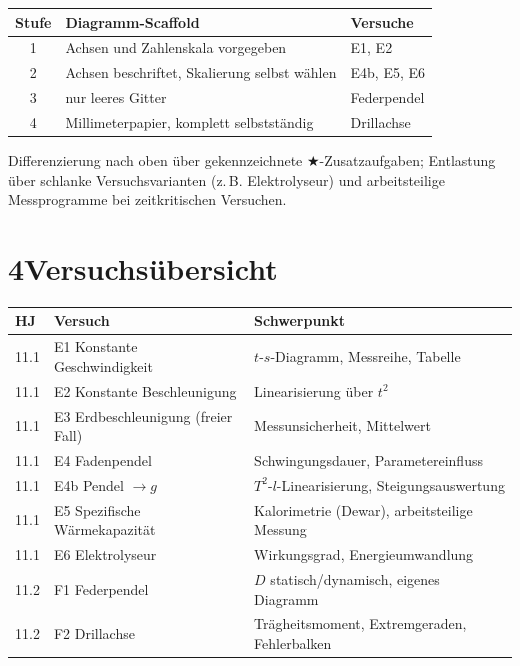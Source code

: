 \documentclass[11pt]{scrartcl}
\begin{document}
\begin{center}
\begin{tabular}{@{}cll@{}}
\toprule
\textbf{Stufe} & \textbf{Diagramm-Scaffold} & \textbf{Versuche} \\
\midrule
1 & Achsen und Zahlenskala vorgegeben        & E1, E2 \\
2 & Achsen beschriftet, Skalierung selbst wählen & E4b, E5, E6 \\
3 & nur leeres Gitter                        & Federpendel \\
4 & Millimeterpapier, komplett selbstständig & Drillachse \\
\bottomrule
\end{tabular}
\end{center}

Differenzierung nach oben über gekennzeichnete $\bigstar$-Zusatzaufgaben;
Entlastung über schlanke Versuchsvarianten (z.\,B. Elektrolyseur) und
arbeitsteilige Messprogramme bei zeitkritischen Versuchen.

\section*{4\quad Versuchsübersicht}
\begin{center}
\begin{tabular}{@{}lll@{}}
\toprule
\textbf{HJ} & \textbf{Versuch} & \textbf{Schwerpunkt} \\
\midrule
11.1 & E1 Konstante Geschwindigkeit & $t$-$s$-Diagramm, Messreihe, Tabelle \\
11.1 & E2 Konstante Beschleunigung  & Linearisierung über $t^2$ \\
11.1 & E3 Erdbeschleunigung (freier Fall) & Messunsicherheit, Mittelwert \\
11.1 & E4 Fadenpendel               & Schwingungsdauer, Parametereinfluss \\
11.1 & E4b Pendel $\rightarrow g$   & $T^2$-$l$-Linearisierung, Steigungsauswertung \\
11.1 & E5 Spezifische Wärmekapazität & Kalorimetrie (Dewar), arbeitsteilige Messung \\
11.1 & E6 Elektrolyseur             & Wirkungsgrad, Energieumwandlung \\
11.2 & F1 Federpendel               & $D$ statisch/dynamisch, eigenes Diagramm \\
11.2 & F2 Drillachse                & Trägheitsmoment, Extremgeraden, Fehlerbalken \\
\bottomrule
\end{tabular}
\end{center}
\end{document}
